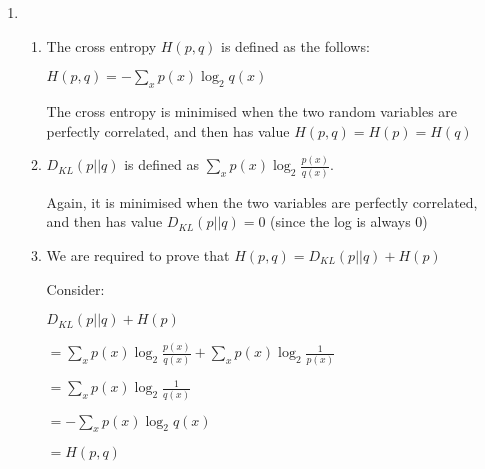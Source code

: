 


\begin{enumerate}[label=(\alph*)]

  \item
    \begin{enumerate}[label=(\roman*)]

      \item
        The cross entropy $H(p,q)$ is defined as the follows:

        $H(p,q) = -\sum_{x} p(x) \log_2 q(x)$

        The cross entropy is minimised when the two random variables are perfectly correlated, and then has value $H(p,q) = H(p) = H(q)$

        \item
          $D_{KL}(p||q)$ is defined as $\sum_x p(x) \log_2 \frac{p(x)}{q(x)}$.

          Again, it is minimised when the two variables are perfectly correlated, and then has value $D_{KL}(p||q) = 0$ (since the log is always 0)

          \item

            We are required to prove that $H(p,q) = D_{KL}(p||q) + H(p)$

            Consider:

            $D_{KL}(p||q) + H(p)$

            $= \sum_x p(x) \log_2 \frac{p(x)}{q(x)} + \sum_x p(x) \log_2 \frac{1}{p(x)}$

            $= \sum_x p(x) \log_2 \frac{1}{q(x)}$

            $= -\sum_x p(x) \log_2 q(x)$

            $= H(p,q)$



        
    \end{enumerate}

        
    \end{enumerate}

